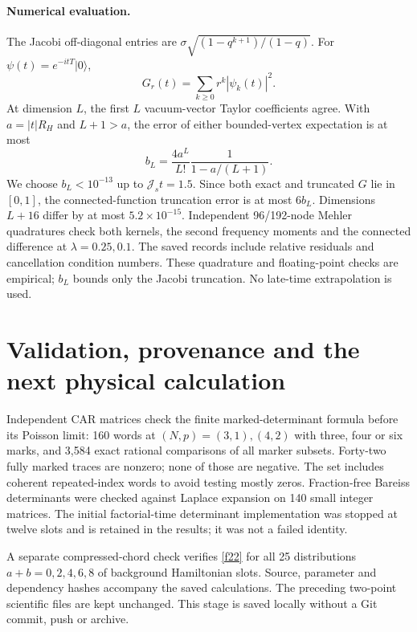 \documentclass[11pt,a4paper]{article}
\newcommand{\Js}{\mathcal J_s}
\begin{document}
\paragraph{Numerical evaluation.}
The Jacobi off-diagonal entries are
$\sigma\sqrt{(1-q^{k+1})/(1-q)}$. For
$\psi(t)=e^{-itT}|0\rangle$,
\begin{equation}
 G_r(t)=\sum_{k\ge0}r^k|\psi_k(t)|^2.
\end{equation}
At dimension $L$, the first $L$ vacuum-vector Taylor coefficients agree.
With $a=|t|R_H$ and $L+1>a$, the error of either bounded-vertex
expectation is at most
\begin{equation}
 b_L=\frac{4a^L}{L!}\frac1{1-a/(L+1)}.
\end{equation}
We choose $b_L<10^{-13}$ up to $\Js t=1.5$. Since both exact and truncated
$G$ lie in $[0,1]$, the connected-function truncation error is at most
$6b_L$. Dimensions $L+16$ differ by at most $5.2\times10^{-15}$.
Independent 96/192-node Mehler quadratures check both kernels, the second
frequency moments and the connected difference at $\lambda=0.25,0.1$.
The saved records include relative residuals and cancellation condition
numbers. These quadrature and floating-point checks are empirical;
$b_L$ bounds only the Jacobi truncation. No late-time extrapolation is used.

\newpage
\section{Validation, provenance and the next physical calculation}
Independent CAR matrices check the finite marked-determinant formula
before its Poisson limit: 160 words at $(N,p)=(3,1),(4,2)$ with three,
four or six marks, and 3,584 exact rational comparisons of all marker
subsets. Forty-two fully marked traces are nonzero; none of those are
negative. The set includes coherent repeated-index words to avoid
testing mostly zeros. Fraction-free Bareiss determinants were checked
against Laplace expansion on 140 small integer matrices. The initial
factorial-time determinant implementation was stopped at twelve slots
and is retained in the results; it was not a failed identity.

A separate compressed-chord check verifies \eqref{f22} for all 25
distributions $a+b=0,2,4,6,8$ of background Hamiltonian slots. Source,
parameter and dependency hashes accompany the saved calculations.
The preceding two-point scientific files are kept unchanged. This stage
is saved locally without a Git commit, push or archive.
\end{document}
